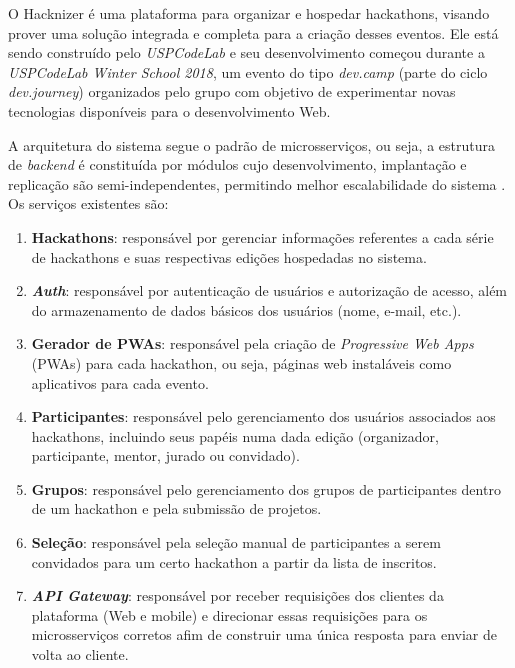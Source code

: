 \documentclass[10pt,twoside,a4paper]{article}
\begin{document}
    O Hacknizer é uma plataforma para organizar e hospedar hackathons, visando prover uma solução integrada e completa para a criação desses eventos. Ele está sendo construído pelo \textit{USPCodeLab} e seu desenvolvimento começou durante a \textit{USPCodeLab Winter School 2018}, um evento do tipo \textit{dev.camp} (parte do ciclo \textit{dev.journey}) organizados pelo grupo com objetivo de experimentar novas tecnologias disponíveis para o desenvolvimento Web.
    
    A arquitetura do sistema segue o padrão de microsserviços, ou seja, a estrutura de \textit{backend} é constituída por módulos cujo desenvolvimento, implantação e replicação são semi-independentes, permitindo melhor escalabilidade do sistema \cite{Newman2015BuildingSystems}. Os serviços existentes são:
    
    \begin{enumerate}
        \item \textbf{Hackathons}: responsável por gerenciar informações referentes a cada série de hackathons e suas respectivas edições hospedadas no sistema.
        
        \item \textbf{\textit{Auth}}: responsável por autenticação de usuários e autorização de acesso, além do armazenamento de dados básicos dos usuários (nome, e-mail, etc.).
        
        \item \textbf{Gerador de PWAs}: responsável pela criação de \textit{Progressive Web Apps} (PWAs) para cada hackathon, ou seja, páginas web instaláveis como aplicativos para cada evento.
        
         \item \textbf{Participantes}: responsável pelo gerenciamento dos usuários associados aos hackathons, incluindo seus papéis numa dada edição (organizador, participante, mentor, jurado ou convidado).
         
         \item \textbf{Grupos}: responsável pelo gerenciamento dos grupos de participantes dentro de um hackathon e pela submissão de projetos.
         
         \item \textbf{Seleção}: responsável pela seleção manual de participantes a serem convidados para um certo hackathon a partir da lista de inscritos.
         
         \item \textbf{\textit{API Gateway}}: responsável por receber requisições dos clientes da plataforma (Web e mobile) e direcionar essas requisições para os microsserviços corretos afim de construir uma única resposta para enviar de volta ao cliente.
    \end{enumerate}
    
\end{document}
